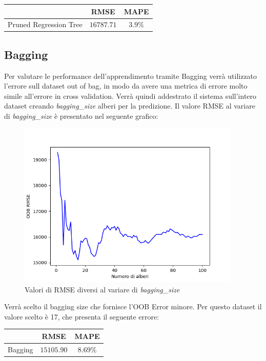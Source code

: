 \documentclass{article}
\begin{document}
    \begin{center}
        \begin{tabular}{|c|c|c|}
            \hline
             & \textbf{RMSE} & \textbf{MAPE} \\
            \hline
            Pruned Regression Tree & $16787.71$ &  $3.9\%$ \\
            \hline
        \end{tabular}
    \end{center}


    \subsection{Bagging}
    Per valutare le performance dell'apprendimento tramite Bagging verrà utilizzato
    l'errore sull dataset out of bag, in modo da avere una metrica di errore
    molto simile all'errore in cross validation. Verrà quindi addestrato il sistema
    sull'intero dataset creando \textit{bagging\_size} alberi per la predizione.
    Il valore RMSE al variare di \textit{bagging\_size} è presentato nel seguente
    grafico: 
    \begin{figure}[h]
        \caption{Valori di RMSE diversi al variare di \textit{bagging\_size}
        }
        \includegraphics[width=10.6cm]{bag}
        \centering
    \end{figure}



    Verrà scelto il bagging size che fornisce l'OOB Error minore. Per questo dataset 
    il valore scelto è 17, che presenta il seguente errore:


    \begin{center}
        \begin{tabular}{|c|c|c|}
            \hline
             & \textbf{RMSE} & \textbf{MAPE} \\
            \hline
            Bagging  & $15105.90$ &  $8.69\%$ \\
            \hline
        \end{tabular}
    \end{center}
\end{document}
